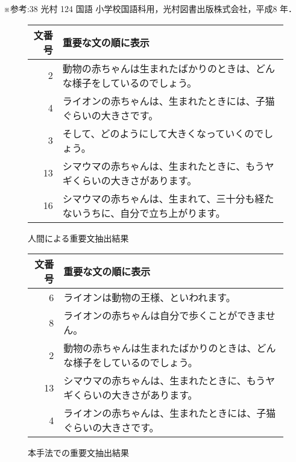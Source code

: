 ※参考:38 光村 124 国語 小学校国語科用，光村図書出版株式会社，平成8
年．


\begin{figure}[htb]

\begin{small}
\begin{tabular}{|r|p{350pt}|} \hline
文番号&	重要な文の順に表示 \\ \hline
     2&	動物の赤ちゃんは生まれたばかりのときは、どんな様子をしているのでしょう。 \\
     4&	ライオンの赤ちゃんは、生まれたときには、子猫ぐらいの大きさです。\\
     3&	そして、どのようにして大きくなっていくのでしょう。\\     
    13&	シマウマの赤ちゃんは、生まれたときに、もうヤギくらいの大きさがあります。\\
    16&	シマウマの赤ちゃんは、生まれて、三十分も経たないうちに、自分で立ち上がります。\\ \hline  
\end{tabular}
\end{small}

\caption{人間による重要文抽出結果}\label{human}

\end{figure}     

\begin{figure}[htb]

\begin{small}
\begin{tabular}{|r|p{350pt}|} \hline
文番号&	重要な文の順に表示 \\ \hline
     6&	ライオンは動物の王様、といわれます。\\
     8&	ライオンの赤ちゃんは自分で歩くことができません。\\
     2&	動物の赤ちゃんは生まれたばかりのときは、どんな様子をしているのでしょう。\\
    13&	シマウマの赤ちゃんは、生まれたときに、もうヤギくらいの大きさがあります。 \\
     4&	ライオンの赤ちゃんは、生まれたときには、子猫ぐらいの大きさです。\\ \hline
\end{tabular}
\end{small}

\caption{本手法での重要文抽出結果}\label{new-method}

\end{figure}

